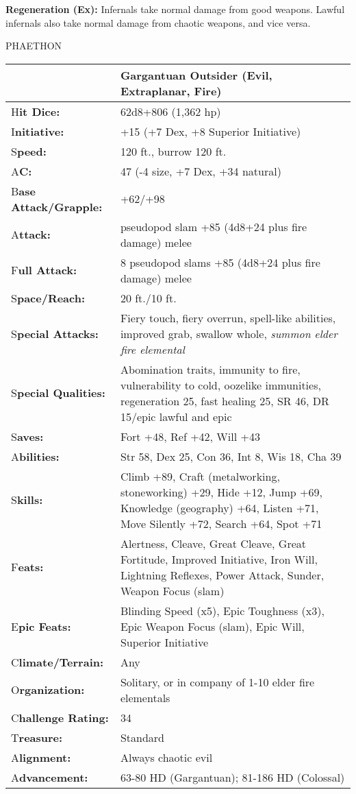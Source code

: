 \documentclass{article}
\begin{document}
\textbf{Regeneration (Ex):} Infernals take normal damage from good weapons. Lawful 
infernals also take normal damage from chaotic weapons, and vice versa. 

\vspace{12pt}
{\LARGE{}PHAETHON }

\begin{tabular}{|>{\raggedright}p{65pt}|>{\raggedright}p{260pt}|}
\hline
  & Gargantuan Outsider (Evil, Extraplanar, Fire)\tabularnewline
\hline
H\textbf{it Dice:} &  62d8+806 (1,362 hp) \tabularnewline
\hline
I\textbf{nitiative:} &  +15 (+7 Dex, +8 Superior Initiative) \tabularnewline
\hline
S\textbf{peed:} &  120 ft., burrow 120 ft. \tabularnewline
\hline
A\textbf{C:} &  47 (-4 size, +7 Dex, +34 natural) \tabularnewline
\hline
B\textbf{ase Attack/Grapple:} &  +62/+98\tabularnewline
\hline
A\textbf{ttack:} &  pseudopod slam +85 (4d8+24 plus fire damage) melee\tabularnewline
\hline
F\textbf{ull Attack:} &  8 pseudopod slams +85 (4d8+24 plus fire damage) melee 
\tabularnewline
\hline
S\textbf{pace/Reach:} &  20 ft./10 ft. \tabularnewline
\hline
S\textbf{pecial Attacks:} &  Fiery touch, fiery overrun, spell-like abilities, 
improved grab, swallow whole, \textit{summon elder fire elemental }\tabularnewline
\hline
S\textbf{pecial Qualities:} &  Abomination traits, immunity to fire, vulnerability 
to cold, oozelike immunities, regeneration 25, fast healing 25, SR 46, DR 15/epic 
lawful and epic \tabularnewline
\hline
S\textbf{aves:} &  Fort +48, Ref +42, Will +43 \tabularnewline
\hline
A\textbf{bilities:} &  Str 58, Dex 25, Con 36, Int 8, Wis 18, Cha 39 \tabularnewline
\hline
S\textbf{kills:} &  Climb +89, Craft (metalworking, stoneworking) +29, Hide +12, 
Jump +69, Knowledge (geography) +64, Listen +71, Move Silently +72, Search +64, 
Spot +71\tabularnewline
\hline
F\textbf{eats:} &  Alertness, Cleave, Great Cleave, Great Fortitude, Improved Initiative, 
Iron Will, Lightning Reflexes, Power Attack, Sunder, Weapon Focus (slam) \tabularnewline
\hline
E\textbf{pic Feats:} &  Blinding Speed (x5), Epic Toughness (x3), Epic Weapon Focus 
(slam), Epic Will, Superior Initiative \tabularnewline
\hline
C\textbf{limate/Terrain:} &  Any \tabularnewline
\hline
O\textbf{rganization:} &  Solitary, or in company of 1-10 elder fire elementals 
\tabularnewline
\hline
C\textbf{hallenge Rating:} &  34 \tabularnewline
\hline
T\textbf{reasure:} &  Standard \tabularnewline
\hline
A\textbf{lignment:} &  Always chaotic evil \tabularnewline
\hline
A\textbf{dvancement:} &  63-80 HD (Gargantuan); 81-186 HD (Colossal) \tabularnewline
\hline
\end{tabular}
\end{document}
